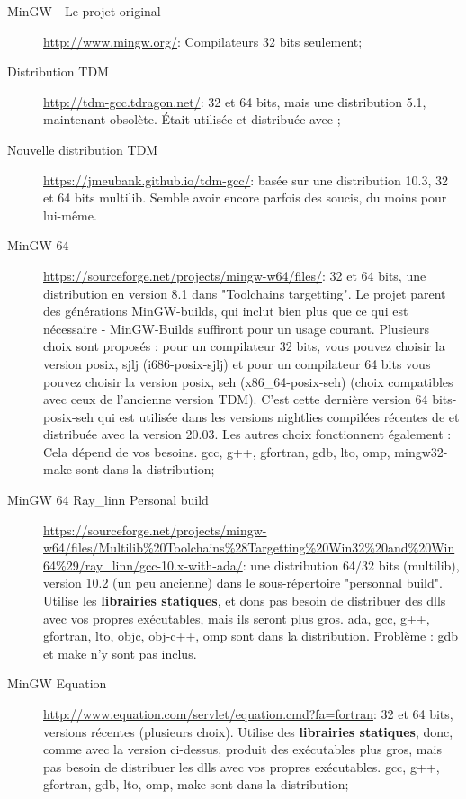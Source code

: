 \begin{description}
\item[MinGW - Le projet original] \url{http://www.mingw.org/}: Compilateurs 32 bits seulement;
\item[Distribution TDM]\url{http://tdm-gcc.tdragon.net/}: 32 et 64 bits, mais une distribution 5.1, maintenant obsolète. Était utilisée et distribuée avec ;
\item[Nouvelle distribution TDM]\url{https://jmeubank.github.io/tdm-gcc/}: basée sur une distribution 10.3, 32 et 64 bits multilib. Semble avoir encore parfois des soucis, du moins pour \codeblocks lui-même.
\item[MinGW 64] \url{https://sourceforge.net/projects/mingw-w64/files/}: 32 et 64 bits, une distribution en version 8.1 dans "Toolchains targetting". Le projet parent des générations MinGW-builds, qui inclut bien plus que ce qui est nécessaire - MinGW-Builds suffiront pour un usage courant. Plusieurs choix sont proposés : pour un compilateur 32 bits, vous pouvez choisir la version posix, sjlj (i686-posix-sjlj) et pour un compilateur 64 bits vous pouvez choisir la version posix, seh (x86\_64-posix-seh) (choix compatibles avec ceux de l'ancienne version TDM). C'est cette dernière version 64 bits-posix-seh qui est utilisée dans les versions nightlies compilées récentes de \codeblocks et distribuée avec la version 20.03. Les autres choix fonctionnent également : Cela dépend de vos besoins. gcc, g++, gfortran, gdb, lto, omp, mingw32-make sont dans la distribution;
\item[MinGW 64 Ray\_linn Personal build] \url{https://sourceforge.net/projects/mingw-w64/files/Multilib%20Toolchains%28Targetting%20Win32%20and%20Win64%29/ray_linn/gcc-10.x-with-ada/}: une distribution 64/32 bits (multilib), version 10.2 (un peu ancienne) dans le sous-répertoire "personnal build". Utilise les \textbf{librairies statiques}, et dons pas besoin de distribuer des dlls avec vos propres exécutables, mais ils seront plus gros. ada, gcc, g++, gfortran, lto, objc, obj-c++, omp sont dans la distribution. Problème : gdb et make n'y sont pas inclus.
\item[MinGW Equation] \url{http://www.equation.com/servlet/equation.cmd?fa=fortran}: 32 et 64 bits, versions récentes (plusieurs choix). Utilise des \textbf{librairies statiques}, donc, comme avec la version ci-dessus, produit des exécutables plus gros, mais pas besoin de distribuer les dlls avec vos propres exécutables.  gcc, g++, gfortran, gdb, lto, omp, make sont dans la distribution;

\end{description}
